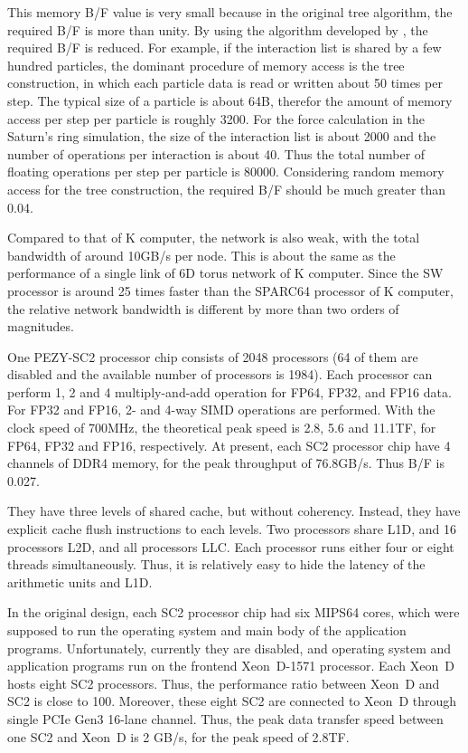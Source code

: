 \documentclass[Afour,sageh,times]{sagej}
\newcommand{\rev}[1]{{#1}}
\begin{document}
\rev{This memory B/F value is very small because in the original tree
  algorithm, the required B/F is more than unity. By using the
  algorithm developed by \citet{Barnes1990}, the required B/F is
  reduced. For example, if the interaction list is shared by a few
  hundred particles, the dominant procedure of memory access is the
  tree construction, in which each particle data is read or written
  about 50 times per step. The typical size of a particle is about
  64B, therefor the amount of memory access per step per particle is
  roughly 3200. For the force calculation in the Saturn's ring
  simulation, the size of the interaction list is about 2000 and the
  number of operations per interaction is about 40. Thus the total
  number of floating operations per step per particle is
  80000. Considering random memory access for the tree construction,
  the required B/F should be much greater than 0.04. }

Compared to that of K computer, the network is also weak, with the
total bandwidth of around 10GB/s per node. This is about the same as
the performance of a single link of 6D torus network of K
computer. Since the SW processor is around 25 times faster than the
SPARC64 processor of K computer, the relative network bandwidth is
different by more than two orders of magnitudes.

One PEZY-SC2 processor chip consists of 2048 processors (64 of them
are disabled and the available number of processors is 1984). Each
processor can perform 1, 2 and 4 multiply-and-add operation for FP64,
FP32, and FP16 data. For FP32 and FP16, 2- and 4-way SIMD operations
are performed.  With the clock speed of 700MHz, the theoretical peak
speed is 2.8, 5.6 and 11.1TF, for FP64, FP32 and FP16,
respectively. At present, each SC2 processor chip have 4 channels of
DDR4 memory, for the peak throughput of 76.8GB/s. Thus B/F is 0.027.

They have three levels of shared cache, but without
coherency. Instead, they have explicit cache flush instructions to
each levels. Two processors share L1D, and 16 processors L2D, and all
processors LLC. Each processor runs either four or eight threads
simultaneously. Thus, it is relatively easy to hide the latency of the
arithmetic units and L1D.

In the original design, each SC2 processor chip had six MIPS64 cores,
which were supposed to run the operating system and main body of the
application programs. Unfortunately, currently they are disabled, and
operating system and application programs run on the frontend
Xeon~D-1571 processor. Each Xeon~D hosts eight SC2 processors. Thus,
the performance ratio between Xeon~D and SC2 is close to 100.
Moreover, these eight SC2 are connected to Xeon~D through single PCIe
Gen3 16-lane channel. Thus, the peak data transfer speed between one
SC2 and Xeon~D is 2 GB/s, for the peak speed of 2.8TF.
\end{document}
